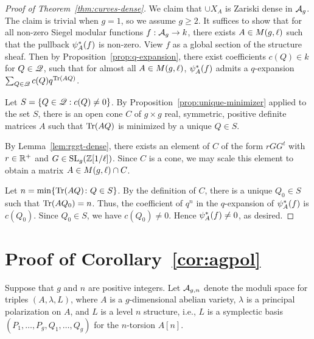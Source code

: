 \documentclass{amsart}
\begin{document}
\begin{proof}[Proof of Theorem~\ref{thm:curves-dense}]
  We claim that $\cup X_A$ is Zariski dense in $\mathcal{A}_g$. The claim is trivial when $g = 1$, so we assume $g \geq 2$. It suffices to show that for all non-zero Siegel modular functions $f: \mathcal{A}_g \to k$, there exists $A \in M(g,\ell)$ such that the pullback $\psi_{A}^*(f)$ is non-zero. View $f$ as a global section of the structure sheaf. Then by Proposition~\ref{prop:q-expansion}, there exist coefficients $c(Q) \in k$ for $Q \in \mathscr{Q}$, such that for almost all $A \in M(g,\ell)$, $\psi_{A}^*(f)$ admits a $q$-expansion $\sum_{Q \in \mathscr{Q}} c(Q) q^{\operatorname{Tr}(AQ)}$.

  Let $S = \{ Q \in \mathscr{Q} :c(Q) \neq 0\}$. By Proposition~\ref{prop:unique-minimizer} applied to the set $S$, there is an open cone $C$ of $g \times g$ real, symmetric, positive definite matrices $A$ such that $\operatorname{Tr}(AQ)$ is minimized by a unique $Q \in S$.

  By Lemma~\ref{lem:rggt-dense}, there exists an element of $C$ of the form $rGG^t$ with $r \in \mathbb{R}^+$ and $G \in \operatorname{SL}_g(\mathbb{Z}[1/\ell])$. Since $C$ is a cone, we may scale this element to obtain a matrix $A \in M(g,\ell) \cap C$. %

  Let $n = \min \{\operatorname{Tr}(AQ) \colon Q \in S\}$. By the definition of $C$, there is a unique $Q_0 \in S$ such that $\operatorname{Tr}(AQ_0) = n$.
    Thus, the coefficient of $q^n$ in the $q$-expansion of $\psi_{A}^*(f)$ is $c(Q_0)$. Since $Q_0 \in S$, we have $c(Q_0) \ne 0$. Hence $\psi_{A}^*(f) \neq 0$, as desired.
\end{proof}


\section{Proof of Corollary~\ref{cor:agpol}}
\label{sec:Cor15proof}

Suppose that $g$ and $n$ are positive integers.
Let $\mathcal{A}_{g,n}$ denote the moduli space for triples $(A,\lambda,L)$, where $A$ is a $g$-dimensional abelian variety, $\lambda$ is a principal polarization on $A$, and $L$ is a level $n$ structure, i.e., $L$ is a symplectic basis $(P_1,\ldots,P_g,Q_1,\ldots,Q_g)$ for the $n$-torsion $A[n]$.
\end{document}
